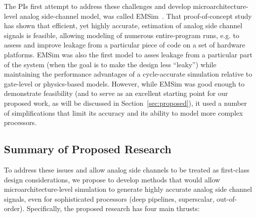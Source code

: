 \documentclass[11 pt]{article}
\begin{document}
The PIs first attempt to address these challenges and develop microarchitecture-level analog side-channel model, was called EMSim~\cite{Nader2020}. That proof-of-concept study has shown that efficient, yet highly accurate, estimation of analog side channel signals is feasible, allowing modeling of numerous entire-program runs, e.g. to assess and improve leakage from a particular piece of code on a set of hardware platforms. EMSim was also the first model to asses leakage from a particular part of the system (when the goal is to make the design less ``leaky'') while maintaining the performance advantages of a cycle-accurate simulation relative to gate-level or physics-based models. However, while EMSim was good enough to demonstrate feasibility (and to serve as an excellent starting point for our proposed work, as will be discussed in Section~\ref{sec:proposed}), it used a number of simplifications that limit its accuracy and its ability to model more complex processors.

\subsection{Summary of Proposed Research}
To address these issues and allow analog side channels to be treated as first-class design considerations, we propose to develop methods that would allow microarchitecture-level simulation to generate highly accurate analog side channel signals, even for sophisticated processors (deep pipelines, superscalar, out-of-order). Specifically, the proposed research has four main thrusts:
\end{document}
